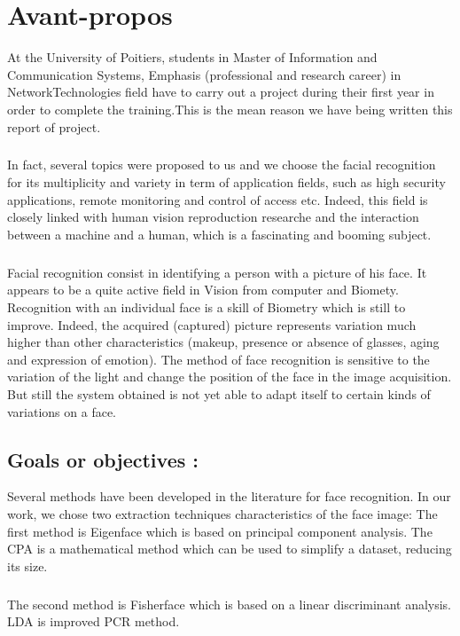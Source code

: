 \chapter*{Avant-propos}

At the University of Poitiers, students in Master of Information and Communication Systems, Emphasis  (professional and research career) in NetworkTechnologies field have to carry out a project during their first year in order to complete the training.This is the mean reason we have being written this report of project.   
\paragraph{}
In fact, several topics were proposed to us and we choose the facial recognition for its multiplicity and variety in term of application fields, such as high security applications, remote monitoring and control of access etc. Indeed, this field is closely linked with human vision reproduction researche and the interaction between a machine and a human, which is a fascinating and booming subject.
\paragraph{}
Facial recognition consist in identifying a person with a picture of his face. It appears to be a quite active field in Vision from computer and Biomety. Recognition with an individual face is a skill of Biometry which is still to improve. Indeed, the acquired (captured) picture represents variation much higher than other characteristics (makeup, presence or absence of glasses, aging and expression of emotion). The method of face recognition is sensitive to the variation of the light and change the position of the face in the image acquisition. But still the system obtained is not yet able to adapt itself to certain kinds of variations on a face.

\section{Goals or objectives :}
Several methods have been developed in the literature for face recognition. In our work, we chose two extraction techniques characteristics of the face image:
The first method is Eigenface which is based on principal component analysis. The CPA is a mathematical method which can be used to simplify a dataset, reducing its size.
\paragraph{}
The second method is Fisherface which is based on a linear discriminant analysis. LDA is improved PCR method.
